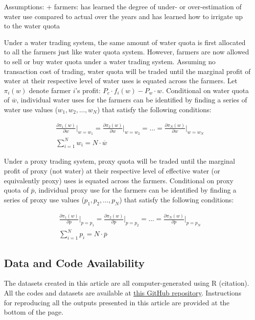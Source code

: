 \documentclass[
]{article}
\begin{document}
Assumptions:
+ farmers: has learned the degree of under- or over-estimation of water use compared to actual over the years and has learned how to irrigate up to the water quota

Under a water trading system, the same amount of water quota is first allocated to all the farmers just like water quota system. However, farmers are now allowed to sell or buy water quota under a water trading system. Assuming no transaction cost of trading, water quota will be traded until the marginal profit of water at their respective level of water uses is equated across the farmers. Let \(\pi_i(w)\) denote farmer \(i\)'s profit: \(P_c \cdot f_i(w) - P_w \cdot w\). Conditional on water quota of \(\overline{w}\), individual water uses for the farmers can be identified by finding a series of water use values (\(w_1, w_2, \dots, w_N\)) that satisfy the following conditions:

\begin{align}
& \frac{\partial \pi_1(w)}{\partial w}\Big\rvert_{w = w_1} = \frac{\partial \pi_2(w)}{\partial w}\Big\rvert_{w = w_2} = \dots = \frac{\partial \pi_N(w)}{\partial w}\Big\rvert_{w = w_N} \\
& \sum_{i=1}^N w_i = N \cdot \overline{w}
\end{align}

Under a proxy trading system, proxy quota will be traded until the marginal profit of proxy (not water) at their respective level of effective water (or equivalently proxy) uses is equated across the farmers. Conditional on proxy quota of \(\overline{p}\), individual proxy use for the farmers can be identified by finding a series of proxy use values (\(p_1, p_2, \dots, p_N\)) that satisfy the following conditions:

\begin{align}
& \frac{\partial \pi_1(w)}{\partial p}\Big\rvert_{p = p_1} = \frac{\partial \pi_2(w)}{\partial p}\Big\rvert_{p = p_2} = \dots = \frac{\partial \pi_N(w)}{\partial p}\Big\rvert_{p = p_N} \\
& \sum_{i=1}^N p_i = N \cdot \overline{p}
\end{align}

\subsection{Data and Code Availability}\label{data-and-code-availability}

The datasets created in this article are all computer-generated using R (citation). All the codes and datasets are available at \href{https://github.com/tmieno2/Measurement-Error-Water-Management}{this GitHub repository}. Instructions for reproducing all the outputs presented in this article are provided at the bottom of the page.
\end{document}
